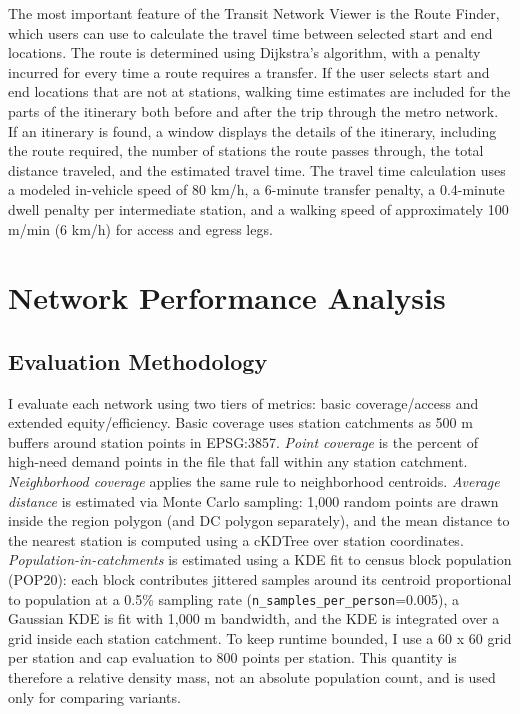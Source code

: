 \documentclass[sigconf,nonacm]{acmart}
\begin{document}
The most important feature of the Transit Network Viewer is the Route Finder, which users can use to calculate the travel time between selected start and end locations. The route is determined using Dijkstra's algorithm, with a penalty incurred for every time a route requires a transfer. If the user selects start and end locations that are not at stations, walking time estimates are included for the parts of the itinerary both before and after the trip through the metro network. If an itinerary is found, a window displays the details of the itinerary, including the route required, the number of stations the route passes through, the total distance traveled, and the estimated travel time. The travel time calculation uses a modeled in-vehicle speed of 80 km/h, a 6-minute transfer penalty, a 0.4-minute dwell penalty per intermediate station, and a walking speed of approximately 100 m/min (6 km/h) for access and egress legs. 

\section{Network Performance Analysis}

\subsection{Evaluation Methodology}
I evaluate each network using two tiers of metrics: basic coverage/access and extended equity/efficiency. Basic coverage uses station catchments as 500 m buffers around station points in EPSG:3857. \textit{Point coverage} is the percent of high-need demand points in the file that fall within any station catchment. \textit{Neighborhood coverage} applies the same rule to neighborhood centroids. \textit{Average distance} is estimated via Monte Carlo sampling: 1,000 random points are drawn inside the region polygon (and DC polygon separately), and the mean distance to the nearest station is computed using a cKDTree over station coordinates. \textit{Population-in-catchments} is estimated using a KDE fit to census block population (POP20): each block contributes jittered samples around its centroid proportional to population at a 0.5\% sampling rate (\texttt{n\_samples\_per\_person}=0.005), a Gaussian KDE is fit with 1,000 m bandwidth, and the KDE is integrated over a grid inside each station catchment. To keep runtime bounded, I use a 60 x 60 grid per station and cap evaluation to 800 points per station. This quantity is therefore a relative density mass, not an absolute population count, and is used only for comparing variants.
\end{document}
